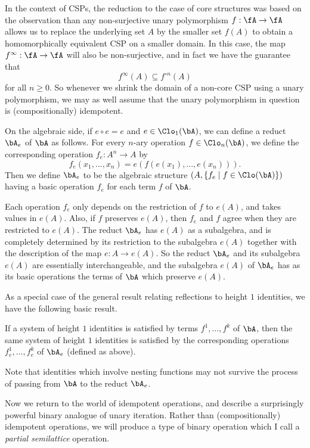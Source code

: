In the context of CSPs, the reduction to the case of core structures was based on the observation than any non-surjective unary polymorphism $f : \fA \rightarrow \fA$ allows us to replace the underlying set $A$ by the smaller set $f(A)$ to obtain a homomorphically equivalent CSP on a smaller domain. In this case, the map $f^\infty : \fA \rightarrow \fA$ will also be non-surjective, and in fact we have the guarantee that
\[
f^\infty(A) \subseteq f^{\circ n}(A)
\]
for all $n \ge 0$. So whenever we shrink the domain of a non-core CSP using a unary polymorphism, we may as well assume that the unary polymorphism in question is (compositionally) idempotent.

On the algebraic side, if $e \circ e = e$ and $e \in \Clo_1(\bA)$, we can define a reduct $\bA_e$ of $\bA$ as follows. For every $n$-ary operation $f \in \Clo_n(\bA)$, we define the corresponding operation $f_e : A^n \rightarrow A$ by
\[
f_e(x_1, ..., x_n) = e(f(e(x_1), ..., e(x_n))).
\]
Then we define $\bA_e$ to be the algebraic structure $(A, \{f_e \mid f \in \Clo(\bA)\})$ having a basic operation $f_e$ for each term $f$ of $\bA$.

Each operation $f_e$ only depends on the restriction of $f$ to $e(A)$, and takes values in $e(A)$. Also, if $f$ preserves $e(A)$, then $f_e$ and $f$ agree when they are restricted to $e(A)$. The reduct $\bA_e$ has $e(A)$ as a subalgebra, and is completely determined by its restriction to the subalgebra $e(A)$ together with the description of the map $e : A \rightarrow e(A)$. So the reduct $\bA_e$ and its subalgebra $e(A)$ are essentially interchangeable, and the subalgebra $e(A)$ of $\bA_e$ has as its basic operations the terms of $\bA$ which preserve $e(A)$.

As a special case of the general result relating reflections to height $1$ identities, we have the following basic result.

\begin{prop} If a system of height $1$ identities is satisfied by terms $f^1, ..., f^k$ of $\bA$, then the same system of height $1$ identities is satisfied by the corresponding operations $f^1_e, ..., f^k_e$ of $\bA_e$ (defined as above).
\end{prop}

Note that identities which involve nesting functions may not survive the process of passing from $\bA$ to the reduct $\bA_e$.

Now we return to the world of idempotent operations, and describe a surprisingly powerful binary analogue of unary iteration. Rather than (compositionally) idempotent operations, we will produce a type of binary operation which I call a \emph{partial semilattice} operation.

